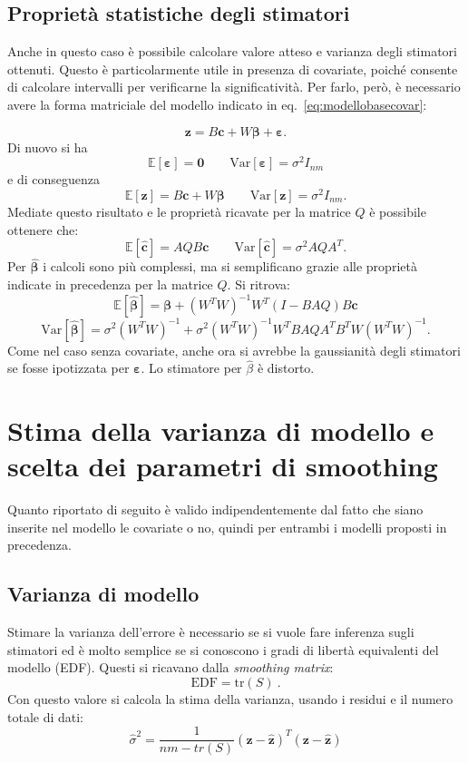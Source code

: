 \documentclass[a4paper,11pt,twoside,openright]{book}							%
\begin{document}
\subsection{Proprietà statistiche degli stimatori}
\label{sec:IC}
Anche in questo caso è possibile calcolare valore atteso e varianza degli stimatori ottenuti. Questo è particolarmente utile in presenza di covariate, poiché consente di calcolare intervalli per verificarne la significatività. Per farlo, però, è necessario avere la forma matriciale del modello indicato in eq.~\eqref{eq:modellobasecovar}:

\begin{equation}
\label{eq:modellobasecovarmatric}
\bm z=B \bm c + W \bm \beta + \bm \varepsilon .
\end{equation}
Di nuovo si ha 
$$
\mathbb{E}[\bm \varepsilon] = \bm 0 \qquad \mathrm{Var}[\bm \varepsilon] = \sigma^2 I_{nm}
$$
e di conseguenza
$$
\mathbb{E}[\bm z] = B \bm c + W \bm \beta \qquad \mathrm{Var}[\bm z] = \sigma^2 I_{nm} .
$$
Mediate questo risultato e le proprietà ricavate per la matrice $Q$ è possibile ottenere che:
$$
\mathbb{E}[\hat  {\bm c}] = AQB \bm c \qquad \mathrm{Var}[\hat  {\bm c}] = \sigma^2 AQA^T .
$$
Per $\hat  {\bm \beta}$ i calcoli sono più complessi, ma si semplificano grazie alle proprietà indicate in precedenza per la matrice $Q$. Si ritrova:
$$
\mathbb{E}[\hat  {\bm \beta}] = \bm \beta + (W^TW)^{-1}W^T(I-B AQ)B\bm c
$$
$$ \mathrm{Var}[\hat  {\bm \beta}] = \sigma^2 (W^TW)^{-1} + \sigma^2 (W^TW)^{-1}W^T B A Q A^T B^T W(W^TW)^{-1}.
$$
Come nel caso senza covariate, anche ora si avrebbe la gaussianità degli stimatori se fosse ipotizzata per $\bm \varepsilon$. Lo stimatore per $\hat{\beta}$ è distorto.


\section{Stima della varianza di modello e scelta dei parametri di smoothing}
\label{sez:GCV}

Quanto riportato di seguito è valido indipendentemente dal fatto che siano inserite nel modello le covariate o no, quindi per entrambi i modelli proposti in precedenza.

\subsection{Varianza di modello}
Stimare la varianza dell'errore è necessario se si vuole fare inferenza sugli stimatori ed è molto semplice se si conoscono i gradi di libertà equivalenti del modello (EDF). Questi si ricavano dalla \textit{smoothing matrix}:
$$
\mathrm{EDF}=\mathrm{tr}(S) \ .
$$
Con questo valore si calcola la stima della varianza, usando i residui e il numero totale di dati:
$$
\hat{\sigma}^2=\frac{1}{nm-tr(S)}(\bm z - \hat  {\bm z})^T(\bm z - \hat  {\bm z})
$$
\end{document}
